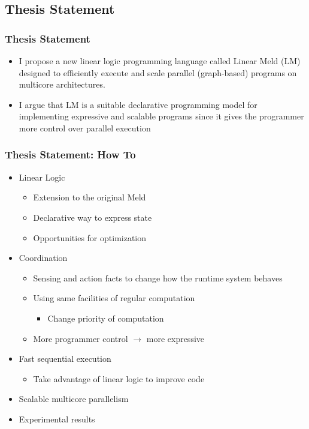 \documentclass{beamer}
\begin{document}
\subsection{Thesis Statement}

\frame
{
   \frametitle{Thesis Statement}
   \begin{itemize}
      \item I propose a new linear logic programming language called Linear Meld (LM) designed to efficiently execute and scale parallel (graph-based) programs on multicore architectures.
      \item I argue that LM is a suitable declarative programming model for implementing expressive and scalable programs since it gives the programmer more control over parallel execution
   \end{itemize}
}   

\begin{frame}[fragile]
   \frametitle{Thesis Statement: How To}
   \begin{itemize}
      \item Linear Logic
      \begin{itemize}
         \item Extension to the original Meld
         \item Declarative way to express state
         \item Opportunities for optimization
      \end{itemize}
      \item Coordination
      \begin{itemize}
         \item Sensing and action facts to change how the runtime system behaves
         \item Using same facilities of regular computation
         \begin{itemize}
            \item Change priority of computation 
         \end{itemize}
         \item More programmer control $\rightarrow$ more expressive
      \end{itemize}
      \item Fast sequential execution
      \begin{itemize}
         \item Take advantage of linear logic to improve code
      \end{itemize}
      \item Scalable multicore parallelism
      \item Experimental results
   \end{itemize}
\end{frame}
\end{document}

